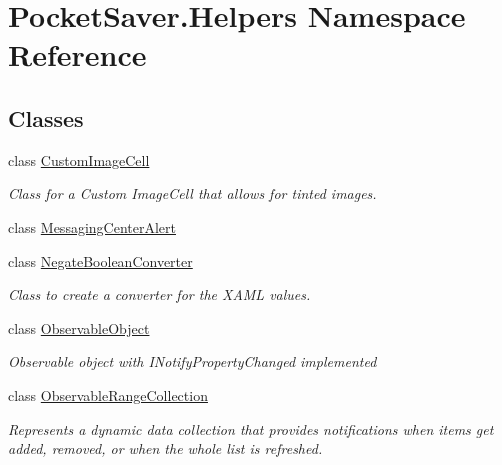 \hypertarget{namespace_pocket_saver_1_1_helpers}{}\section{Pocket\+Saver.\+Helpers Namespace Reference}
\label{namespace_pocket_saver_1_1_helpers}
\subsection*{Classes}
\begin{DoxyCompactItemize}
\item 
class \hyperlink{class_pocket_saver_1_1_helpers_1_1_custom_image_cell}{Custom\+Image\+Cell}
\begin{DoxyCompactList}\small\item\em Class for a Custom Image\+Cell that allows for tinted images. \end{DoxyCompactList}\item 
class \hyperlink{class_pocket_saver_1_1_helpers_1_1_messaging_center_alert}{Messaging\+Center\+Alert}
\item 
class \hyperlink{class_pocket_saver_1_1_helpers_1_1_negate_boolean_converter}{Negate\+Boolean\+Converter}
\begin{DoxyCompactList}\small\item\em Class to create a converter for the X\+A\+ML values. \end{DoxyCompactList}\item 
class \hyperlink{class_pocket_saver_1_1_helpers_1_1_observable_object}{Observable\+Object}
\begin{DoxyCompactList}\small\item\em Observable object with I\+Notify\+Property\+Changed implemented \end{DoxyCompactList}\item 
class \hyperlink{class_pocket_saver_1_1_helpers_1_1_observable_range_collection}{Observable\+Range\+Collection}
\begin{DoxyCompactList}\small\item\em Represents a dynamic data collection that provides notifications when items get added, removed, or when the whole list is refreshed. \end{DoxyCompactList}\end{DoxyCompactItemize}
